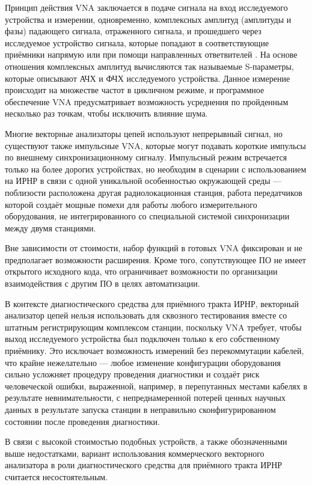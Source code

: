 \documentclass{report}
\begin{document}
Принцип действия VNA заключается в подаче сигнала на вход исследуемого устройства и измерении, одновременно, комплексных амплитуд (амплитуды и фазы) падающего сигнала, отраженного сигнала, и прошедшего через исследуемое устройство сигнала, которые попадают в соответствующие приёмники напрямую или при помощи направленных ответвителей \cite{vna1}. На основе отношения комплексных амплитуд вычисляются так называемые S-параметры, которые описывают АЧХ и ФЧХ исследуемого устройства. Данное измерение происходит на множестве частот в цикличном режиме, и программное обеспечение VNA предусматривает возможность усреднения по пройденным несколько раз точкам, чтобы исключить влияние шума.

Многие векторные анализаторы цепей используют непрерывный сигнал, но существуют также импульсные VNA, которые могут подавать короткие импульсы по внешнему синхронизационному сигналу. Импульсный режим встречается только на более дорогих устройствах, но необходим в сценарии с использованием на ИРНР в связи с одной уникальной особенностью окружающей среды --- поблизости расположена другая радиолокационная станция, работа передатчиков которой создаёт мощные помехи для работы любого измерительного оборудования, не интегрированного со специальной системой синхронизации между двумя станциями.

Вне зависимости от стоимости, набор функций в готовых VNA фиксирован и не предполагает возможности расширения. Кроме того, сопутствующее ПО не имеет открытого исходного кода, что ограничивает возможности по организации взаимодействия с другим ПО в целях автоматизации.

В контексте диагностического средства для приёмного тракта ИРНР, векторный анализатор цепей нельзя использовать для сквозного тестирования вместе со штатным регистрирующим комплексом станции, поскольку VNA требует, чтобы выход исследуемого устройства был подключен только к его собственному приёмнику. Это исключает возможность измерений без перекоммутации кабелей, что крайне нежелательно --- любое изменение конфигурации оборудования сильно усложняет процедуру проведения диагностики и создаёт риск человеческой ошибки, выраженной, например, в перепутанных местами кабелях в результате невнимательности, с непреднамеренной потерей ценных научных данных в результате запуска станции в неправильно сконфигурированном состоянии после проведения диагностики.

В связи с высокой стоимостью подобных устройств, а также обозначенными выше недостатками, вариант использования коммерческого векторного анализатора в роли диагностического средства для приёмного тракта ИРНР считается несостоятельным.
\end{document}
